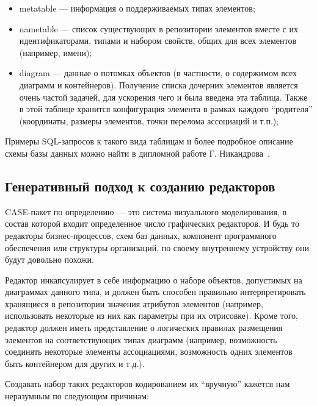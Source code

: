 \documentclass[a5paper]{article}
\begin{document}
\begin{itemize}
  \item metatable --- информация о поддерживаемых типах элементов;
  \item nametable --- список существующих в репозитории
        элементов вместе с их идентификаторами, типами и набором свойств, общих
        для всех элементов (например, имени);
  \item diagram --- данные о потомках объектов (в
        частности, о содержимом всех диаграмм и контейнеров). Получение списка
        дочерних элементов является очень частой задачей, для ускорения чего и
        была введена эта таблица. Также в этой таблице хранится конфигурация
        элемента в рамках каждого ``родителя'' (координаты, размеры элементов,
        точки перелома ассоциаций и т.п.);
\end{itemize}

Примеры SQL-запросов к такого вида таблицам
и более подробное описание схемы базы данных можно найти в дипломной
работе Г. Никандрова~\cite{nikandrov}.

\subsection{Генеративный подход к созданию редакторов}

CASE-пакет по определению --- это система
визуального моделирования, в состав которой входит определенное число
графических редакторов. И будь то редакторы бизнес-процессов, схем баз
данных, компонент программного обеспечения или структуры организаций,
по своему внутреннему устройству они будут довольно похожи.

Редактор инкапсулирует в себе информацию о наборе объектов, допустимых
на диаграммах данного типа, и должен быть способен правильно
интерпретировать хранящиеся в репозитории значения атрибутов элементов
(например, использовать некоторые из них как параметры при их
отрисовке). Кроме того, редактор должен иметь представление о логических правилах размещения
элементов на соответствующих типах диаграмм (например, возможность
соединять некоторые элементы ассоциациями, возможность одних элементов
быть контейнером для других и т.д.).

Создавать набор таких редакторов кодированием их ``вручную'' кажется нам
неразумным по следующим причинам:
\end{document}
